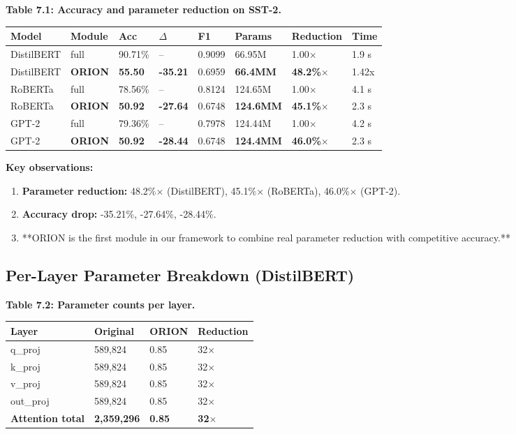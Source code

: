 \textbf{Table 7.1: Accuracy and parameter reduction on SST-2.}

\begin{table}[H]
\centering
\small
\begin{tabular}{llllllll}
\toprule
\textbf{Model} & \textbf{Module} & \textbf{Acc} & \textbf{$\Delta$} & \textbf{F1} & \textbf{Params} & \textbf{Reduction} & \textbf{Time} \\
\midrule
DistilBERT & full & 90.71\% & -- & 0.9099 & 66.95M & 1.00$\times$ & 1.9 s \\
DistilBERT & \textbf{ORION} & \textbf{55.50} & \textbf{-35.21} & 0.6959 & \textbf{66.4MM} & \textbf{48.2\%$\times$} & 1.42x \\
RoBERTa & full & 78.56\% & -- & 0.8124 & 124.65M & 1.00$\times$ & 4.1 s \\
RoBERTa & \textbf{ORION} & \textbf{50.92} & \textbf{-27.64} & 0.6748 & \textbf{124.6MM} & \textbf{45.1\%$\times$} & 2.3 s \\
GPT-2 & full & 79.36\% & -- & 0.7978 & 124.44M & 1.00$\times$ & 4.2 s \\
GPT-2 & \textbf{ORION} & \textbf{50.92} & \textbf{-28.44} & 0.6748 & \textbf{124.4MM} & \textbf{46.0\%$\times$} & 2.3 s \\
\bottomrule
\end{tabular}
\end{table}

\textbf{Key observations:}

\begin{enumerate}
\item \textbf{Parameter reduction:} 48.2\%$\times$ (DistilBERT), 45.1\%$\times$ (RoBERTa),
  46.0\%$\times$ (GPT-2).
\item \textbf{Accuracy drop:} -35.21\%, -27.64\%, -28.44\%.
\item **ORION is the first module in our framework to combine real parameter
  reduction with competitive accuracy.**

\end{enumerate}
\subsection{Per-Layer Parameter Breakdown (DistilBERT)}

\textbf{Table 7.2: Parameter counts per layer.}

\begin{table}[H]
\centering
\small
\begin{tabular}{llll}
\toprule
\textbf{Layer} & \textbf{Original} & \textbf{ORION} & \textbf{Reduction} \\
\midrule
q\_proj & 589,824 & 0.85 & 32$\times$ \\
k\_proj & 589,824 & 0.85 & 32$\times$ \\
v\_proj & 589,824 & 0.85 & 32$\times$ \\
out\_proj & 589,824 & 0.85 & 32$\times$ \\
\textbf{Attention total} & \textbf{2,359,296} & \textbf{0.85} & \textbf{32$\times$} \\
\bottomrule
\end{tabular}
\end{table}

